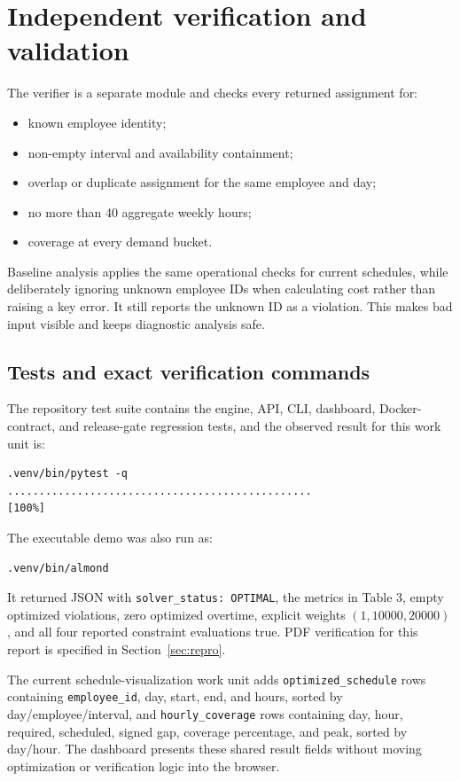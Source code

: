 \documentclass[11pt,a4paper]{article}
\begin{document}

\section{Independent verification and validation}
The verifier is a separate module and checks every returned assignment for:
\begin{itemize}
  \item known employee identity;
  \item non-empty interval and availability containment;
  \item overlap or duplicate assignment for the same employee and day;
  \item no more than 40 aggregate weekly hours;
  \item coverage at every demand bucket.
\end{itemize}

Baseline analysis applies the same operational checks for current schedules, while deliberately ignoring unknown employee IDs when calculating cost rather than raising a key error. It still reports the unknown ID as a violation. This makes bad input visible and keeps diagnostic analysis safe.

\subsection{Tests and exact verification commands}
The repository test suite contains the engine, API, CLI, dashboard, Docker-contract, and release-gate regression tests, and the observed result for this work unit is:
\begin{verbatim}
.venv/bin/pytest -q
................................................                         [100%]
\end{verbatim}
The executable demo was also run as:
\begin{verbatim}
.venv/bin/almond
\end{verbatim}
It returned JSON with \texttt{solver\_status: OPTIMAL}, the metrics in Table 3, empty optimized violations, zero optimized overtime, explicit weights $(1,10000,20000)$, and all four reported constraint evaluations true. PDF verification for this report is specified in Section~\ref{sec:repro}.

The current schedule-visualization work unit adds \texttt{optimized\_schedule} rows containing \texttt{employee\_id}, day, start, end, and hours, sorted by day/employee/interval, and \texttt{hourly\_coverage} rows containing day, hour, required, scheduled, signed gap, coverage percentage, and peak, sorted by day/hour. The dashboard presents these shared result fields without moving optimization or verification logic into the browser.
\end{document}
